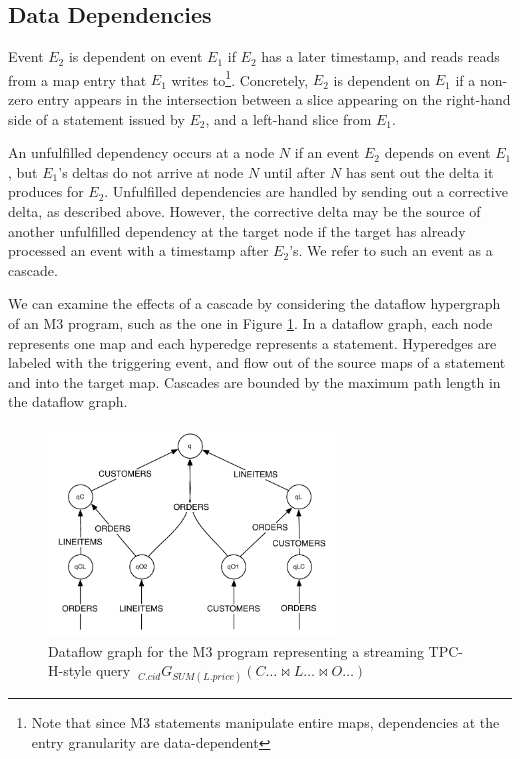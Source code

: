 \documentclass{vldb}
\begin{document}
\subsection{Data Dependencies}
Event $E_2$ is dependent on event $E_1$ if $E_2$ has a later timestamp, and reads reads from a map entry that $E_1$ writes to\footnote{Note that since M3 statements manipulate entire maps, dependencies at the entry granularity are data-dependent}.  Concretely, $E_2$ is dependent on $E_1$ if a non-zero entry appears in the intersection between a slice appearing on the right-hand side of a statement issued by $E_2$, and a left-hand slice from $E_1$.  

An unfulfilled dependency occurs at a node $N$ if an event $E_2$ depends on event $E_1$, but $E_1$'s deltas do not arrive at node $N$ until after $N$ has sent out the delta it produces for $E_2$.  Unfulfilled dependencies are handled by sending out a corrective delta, as described above.  However, the corrective delta may be the source of another unfulfilled dependency at the target node if the target has already processed an event with a timestamp after $E_2$'s.  We refer to such an event as a cascade.

We can examine the effects of a cascade by considering the dataflow hypergraph of an M3 program, such as the one in Figure \ref{fig:dataflow}.  In a dataflow graph, each node represents one map and each hyperedge represents a statement.  Hyperedges are labeled with the triggering event, and flow out of the source maps of a statement and into the target map.  Cascades are bounded by the maximum path length in the dataflow graph. 

\begin{figure}
\begin{center}
\includegraphics[width=3in]{graphics/q12_graph}
\end{center}
\caption{Dataflow graph for the M3 program representing a streaming TPC-H-style query $\ _{C.cid}G_{SUM(L.price)}(C\ldots \bowtie L\ldots \bowtie O\ldots)$}
\label{fig:dataflow}
\end{figure}
\end{document}
